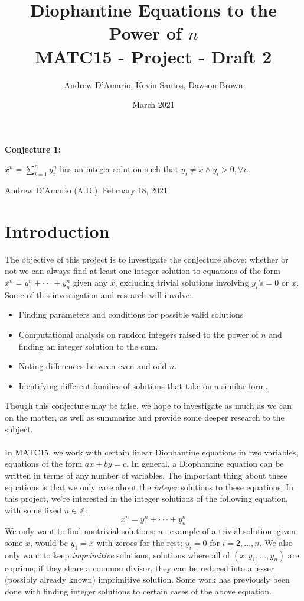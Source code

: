 \documentclass{article}
\title{Diophantine Equations to the Power of $n$ \\ \vspace{.3in} \large{MATC15 - Project - Draft 2}}
\author{Andrew D'Amario, Kevin Santos, Dawson Brown}
\date{March 2021}
\begin{document}
\maketitle

\begin{flushleft}
    {\bf Conjecture 1:}

    \hspace{.5in}$\displaystyle x^n=\sum^{n}_{i=1}y_i^n$ has an integer solution such that $y_i\ne x \land y_i > 0, \forall i$.

    \hspace{2in} Andrew D'Amario (A.D.), February 18, 2021

\section{Introduction}
The objective of this project is to investigate the conjecture above: whether or not we can always find at least one integer solution to equations of the form $x^n=y_1^n+\cdot\cdot\cdot+y_n^n$ given any $x$, excluding trivial solutions involving $y_i$'s$=0$ or $x$. \\
Some of this investigation and research will involve:
\begin{itemize}    
    \item Finding parameters and conditions for possible valid solutions
    \item Computational analysis on random integers raised to the power of $n$ and finding an integer solution to the sum.
    \item Noting differences between even and odd $n$.
    \item Identifying different families of solutions that take on a similar form.
\end{itemize}

Though this conjecture may be false, we hope to investigate as much as we can on the matter, as well as summarize and provide some deeper research to the subject. \\~\\

In MATC15, we work with certain linear Diophantine equations in two variables, equations of the form $ax+by=c$. In general, a Diophantine equation can be written in terms of any number of variables. The important thing about these equations is that we only care about the \textit{integer} solutions to these equations. In this project, we're interested in the integer solutions of the following equation, with some fixed $n \in \mathbb{Z}$:
\begin{equation}
    x^n=y_1^n+\cdot\cdot\cdot+y_n^n
\end{equation}
We only want to find nontrivial solutions; an example of a trivial solution, given some $x$, would be $y_1=x$ with zeroes for the rest: $y_i=0$ for $i=2, ..., n$. We also only want to keep \textit{imprimitive} solutions, solutions where all of $(x,y_1, ..., y_n)$ are coprime; if they share a common divisor, they can be reduced into a lesser (possibly already known) imprimitive solution. Some work has previously been done with finding integer solutions to certain cases of the above equation. 


\end{flushleft}
\end{document}
